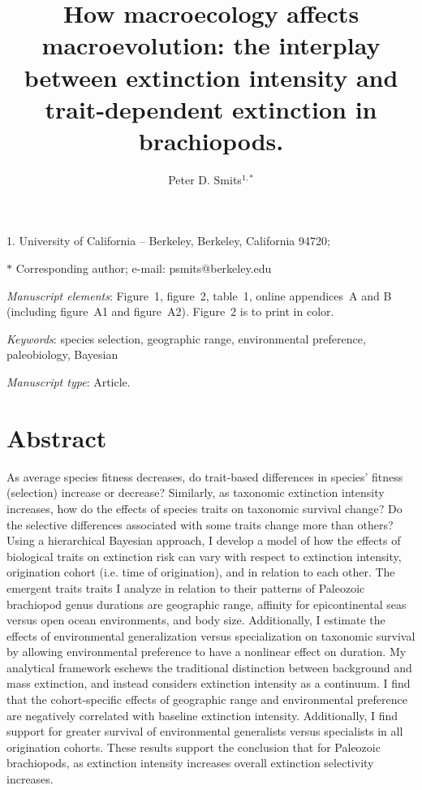 \documentclass[11pt]{article}
\title{How macroecology affects macroevolution: the interplay between extinction intensity and trait-dependent extinction in brachiopods.}
\author{Peter D. Smits$^{1,\ast}$}
\date{}
\begin{document}
\maketitle

\noindent{} 1. University of California -- Berkeley, Berkeley, California 94720;

\noindent{} $\ast$ Corresponding author; e-mail: psmits@berkeley.edu

\bigskip

\textit{Manuscript elements}: Figure~1, figure~2, table~1, online appendices~A and B (including figure~A1 and figure~A2). Figure~2 is to print in color.

\bigskip

\textit{Keywords}: species selection, geographic range, environmental preference, paleobiology, Bayesian

\bigskip

\textit{Manuscript type}: Article. %

\bigskip



\newpage{}

\section*{Abstract}

  As average species fitness decreases, do trait-based differences in species' fitness (selection) increase or decrease? Similarly, as taxonomic extinction intensity increases, how do the effects of species traits on taxonomic survival change? Do the selective differences associated with some traits change more than others? Using a hierarchical Bayesian approach, I develop a model of how the effects of biological traits on extinction risk can vary with respect to extinction intensity, origination cohort (i.e. time of origination), and in relation to each other. The emergent traits traits I analyze in relation to their patterns of Paleozoic brachiopod genus durations are geographic range, affinity for epicontinental seas versus open ocean environments, and body size. Additionally, I estimate the effects of environmental generalization versus specialization on taxonomic survival by allowing environmental preference to have a nonlinear effect on duration. My analytical framework eschews the traditional distinction between background and mass extinction, and instead considers extinction intensity as a continuum. I find that the cohort-specific effects of geographic range and environmental preference are negatively correlated with baseline extinction intensity. Additionally, I find support for greater survival of environmental generalists versus specialists in all origination cohorts. These results support the conclusion that for Paleozoic brachiopods, as extinction intensity increases overall extinction selectivity increases.
\end{document}
